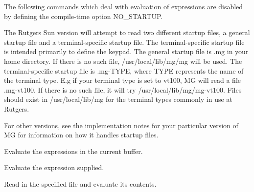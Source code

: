 The following commands which deal with evaluation of expressions are
disabled by defining the compile-time option NO\_STARTUP.  

The Rutgers Sun version will attempt to read two different startup
files, a general startup file and a terminal-specific startup file.
The terminal-specific startup file is intended primarily to define the
keypad.  The general startup file is .mg in your home directory.  If
there is no such file, /usr/local/lib/mg/mg will be used.  The
terminal-specific startup file is .mg-TYPE, where TYPE represents the
name of the terminal type.  E.g if your terminal type is set to vt100,
MG will read a file .mg-vt100.  If there is no such file, it will try
/usr/local/lib/mg/mg-vt100.  Files should exist in /usr/local/lib/mg
for the terminal types commonly in use at Rutgers.

For other versions, see the implementation notes for your particular
version of MG for information on how it handles startup files.


\fbody Evaluate the expressions in the current buffer.

\fbody Evaluate the expression supplied.

\fbody Read in the specified file and evaluate its contents.

